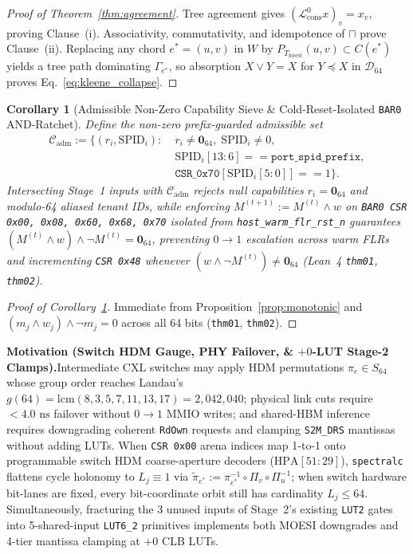 \documentclass[11pt,letterpaper]{article}
\theoremstyle{spectralthm}
\newtheorem{corollary}[theorem]{Corollary}
\begin{document}
\begin{proof}[Proof of Theorem~\ref{thm:agreement}]
Tree agreement gives $(\mathcal{L}_{\mathrm{cons}}^0 x)_v = x_v$, proving Clause~(i). Associativity, commutativity, and idempotence of $\sqcap$ prove Clause~(ii). Replacing any chord $e^* = (u,v)$ in $W$ by $P_{T_{\mathrm{forest}}}(u,v) \subset C(e^*)$ yields a tree path dominating $\Gamma_{e^*}$, so absorption $X \vee Y = X$ for $Y \preceq X$ in $\mathcal{D}_{64}$ proves Eq.~\eqref{eq:kleene_collapse}.
\end{proof}

\begin{corollary}[Admissible Non-Zero Capability Sieve \& Cold-Reset-Isolated \texttt{BAR0} AND-Ratchet]
\label{cor:ratchet}
Define the non-zero prefix-guarded admissible set
\[
\begin{aligned}
\mathcal{C}_{\mathrm{adm}} := \bigl\{(r_i, \mathrm{SPID}_i) :\;& r_i \neq \mathbf{0}_{64},\; \mathrm{SPID}_i \neq 0,\\
&\mathrm{SPID}_i[13:6] == \texttt{port\_spid\_prefix},\\
&\texttt{CSR\_0x70}[\mathrm{SPID}_i[5:0]] == 1\bigr\}.
\end{aligned}
\]
Intersecting Stage~1 inputs with $\mathcal{C}_{\mathrm{adm}}$ rejects null capabilities $r_i = \mathbf{0}_{64}$ and modulo-64 aliased tenant IDs, while enforcing $M^{(t+1)} := M^{(t)} \wedge w$ on \texttt{BAR0 CSR 0x00, 0x08, 0x60, 0x68, 0x70} isolated from \texttt{host\_warm\_flr\_rst\_n} guarantees $(M^{(t)} \wedge w) \wedge \neg M^{(t)} = \mathbf{0}_{64}$, preventing $0 \rightarrow 1$ escalation across warm FLRs and incrementing \texttt{CSR 0x48} whenever $(w \wedge \neg M^{(t)}) \neq \mathbf{0}_{64}$ (Lean~4 \texttt{thm01}, \texttt{thm02}).
\end{corollary}
\begin{proof}[Proof of Corollary~\ref{cor:ratchet}]
Immediate from Proposition~\ref{prop:monotonic} and $(m_j \wedge w_j) \wedge \neg m_j = 0$ across all 64 bits (\texttt{thm01}, \texttt{thm02}).
\end{proof}

\noindent\textbf{Motivation (Switch HDM Gauge, PHY Failover, \& $+0$-LUT Stage-2 Clamps).}\;Intermediate CXL switches may apply HDM permutations $\pi_e \in S_{64}$ whose group order reaches Landau's $g(64) = \mathrm{lcm}(8,3,5,7,11,13,17) = 2,042,040$; physical link cuts require $<4.0\text{~ns}$ failover without $0 \rightarrow 1$ MMIO writes; and shared-HBM inference requires downgrading coherent \texttt{RdOwn} requests and clamping \texttt{S2M\_DRS} mantissas without adding LUTs. When \texttt{CSR 0x00} arena indices map 1-to-1 onto programmable switch HDM coarse-aperture decoders ($\mathrm{HPA}[51:29]$), \texttt{spectralc} flattens cycle holonomy to $L_j \equiv 1$ via $\widetilde{\pi}_{e^*} := \pi_{e^*}^{-1} \circ \Pi_v \circ \Pi_u^{-1}$; when switch hardware bit-lanes are fixed, every bit-coordinate orbit still has cardinality $L_j \le 64$. Simultaneously, fracturing the 3 unused inputs of Stage~2's existing \texttt{LUT2} gates into 5-shared-input \mbox{\texttt{LUT6\_2}} primitives implements both MOESI downgrades and 4-tier mantissa clamping at $+0$ CLB LUTs.
\end{document}
